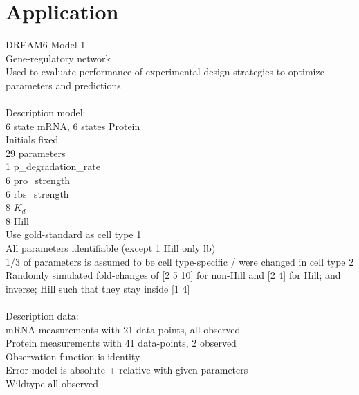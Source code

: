 \documentclass{bioinfo}
\begin{document}


\section{Application}
DREAM6 Model 1\\
Gene-regulatory network\\
Used to evaluate performance of experimental design strategies to optimize parameters and predictions\\ \\
Description model:\\
6 state mRNA, 6 states Protein\\
Initials fixed\\
29 parameters\\
1 p\_degradation\_rate\\
6 pro\_strength\\
6 rbs\_strength\\
8 $K_d$\\
8 Hill\\
Use gold-standard as cell type 1\\
All parameters identifiable (except 1 Hill only lb)\\
1/3 of parameters is assumed to be cell type-specific / were changed in cell type 2\\
Randomly simulated fold-changes of [2 5 10] for non-Hill and [2 4] for Hill; and inverse; Hill such that they stay inside [1 4]\\ \\
Description data:\\
mRNA measurements with 21 data-points, all observed\\
Protein measurements with 41 data-points, 2 observed\\
Observation function is identity\\
Error model is absolute + relative with given parameters\\
Wildtype all observed\\
\end{document}
